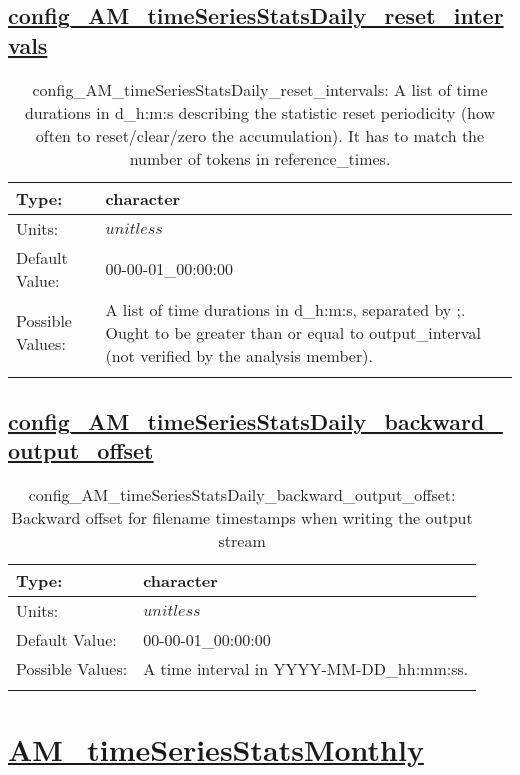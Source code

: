 \subsection[config\_AM\_timeSeriesStatsDaily\_reset\_intervals]{\hyperref[sec:nm_tab_AM_timeSeriesStatsDaily]{config\_AM\_timeSeriesStatsDaily\_reset\_intervals}}
\label{subsec:nm_sec_config_AM_timeSeriesStatsDaily_reset_intervals}
\begin{center}
\begin{longtable}{| p{2.0in} || p{4.0in} |}
    \hline
    Type: & character \\
    \hline
    Units: & $unitless$ \\
    \hline
    Default Value: & 00-00-01\_00:00:00 \\
    \hline
    Possible Values: & A list of time durations in d\_h:m:s, separated by ;. Ought to be greater than or equal to output\_interval (not verified by the analysis member). \\
    \hline
    \caption{config\_AM\_timeSeriesStatsDaily\_reset\_intervals: A list of time durations in d\_h:m:s describing the statistic reset periodicity (how often to reset/clear/zero the accumulation). It has to match the number of tokens in reference\_times.}
\end{longtable}
\end{center}
\subsection[config\_AM\_timeSeriesStatsDaily\_backward\_output\_offset]{\hyperref[sec:nm_tab_AM_timeSeriesStatsDaily]{config\_AM\_timeSeriesStatsDaily\_backward\_output\_offset}}
\label{subsec:nm_sec_config_AM_timeSeriesStatsDaily_backward_output_offset}
\begin{center}
\begin{longtable}{| p{2.0in} || p{4.0in} |}
    \hline
    Type: & character \\
    \hline
    Units: & $unitless$ \\
    \hline
    Default Value: & 00-00-01\_00:00:00 \\
    \hline
    Possible Values: & A time interval in YYYY-MM-DD\_hh:mm:ss. \\
    \hline
    \caption{config\_AM\_timeSeriesStatsDaily\_backward\_output\_offset: Backward offset for filename timestamps when writing the output stream}
\end{longtable}
\end{center}
\section[AM\_timeSeriesStatsMonthly]{\hyperref[sec:nm_tab_AM_timeSeriesStatsMonthly]{AM\_timeSeriesStatsMonthly}}
\label{sec:nm_sec_AM_timeSeriesStatsMonthly}
